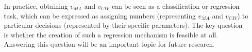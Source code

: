 

In practice, obtaining $v_{MA}$ and $v_{CIV}$ can be seen as a classification or regression task, which can be expressed as assigning numbers (representing $v_{MA}$ and $v_{CIV}$) to particular decisions (represented by their specific parameters). The key question is whether the creation of such a regression mechanism is feasible at all. Answering this question will be an important topic for future research.




